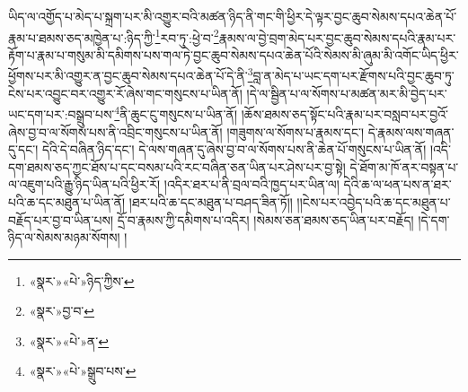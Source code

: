 ཡིད་ལ་འགྱོད་པ་མེད་པ་སྐྲག་པར་མི་འགྱུར་བའི་མཚན་ཉིད་ནི་གང་གི་ཕྱིར་དེ་ལྟར་བྱང་ཆུབ་སེམས་དཔའ་ཆེན་པོ་རྣམ་པ་ཐམས་ཅད་མཁྱེན་པ་:ཉིད་ཀྱི་\footnote{«སྣར་»«པེ་»ཉིད་ཀྱིས་}རབ་ཏུ་:ཕྱེ་བ་\footnote{«སྣར་»བྱ་བ་}རྣམས་ལ་བྱེ་བྲག་མེད་པར་བྱང་ཆུབ་སེམས་དཔའི་རྣམ་པར་རྟོག་པ་རྣམ་པ་གསུམ་མི་དམིགས་པས་གལ་ཏེ་བྱང་ཆུབ་སེམས་དཔའ་ཆེན་པོའི་སེམས་མི་ཞུམ་མི་འགོང་ཡིད་ཕྱིར་ཕྱོགས་པར་མི་འགྱུར་ན་བྱང་ཆུབ་སེམས་དཔའ་ཆེན་པོ་དེ་ནི་\footnote{«སྣར་»«པེ་»ན་}བླ་ན་མེད་པ་ཡང་དག་པར་རྫོགས་པའི་བྱང་ཆུབ་ཏུ་ངེས་པར་འབྱུང་བར་འགྱུར་རོ་ཞེས་གང་གསུངས་པ་ཡིན་ནོ། །དེ་ལ་སྦྱིན་པ་ལ་སོགས་པ་མཚན་མར་མི་བྱེད་པར་ཡང་དག་པར་:བསྒྲུབ་པས་\footnote{«སྣར་»«པེ་»སྒྲུབ་པས་}ནི་ཆུང་ངུ་གསུངས་པ་ཡིན་ནོ། །ཆོས་ཐམས་ཅད་སྟོང་པའི་རྣམ་པར་བསླབ་པར་བྱའོ་ཞེས་བྱ་བ་ལ་སོགས་པས་ནི་འབྲིང་གསུངས་པ་ཡིན་ནོ། །གཟུགས་ལ་སོགས་པ་རྣམས་དང་། དེ་རྣམས་ལས་གཞན་དུ་དང་། དེའི་དེ་བཞིན་ཉིད་དང་། དེ་ལས་གཞན་དུ་ཞེས་བྱ་བ་ལ་སོགས་པས་ནི་ཆེན་པོ་གསུངས་པ་ཡིན་ནོ། །འདི་དག་ཐམས་ཅད་ཀྱང་ཐོས་པ་དང་བསམ་པའི་རང་བཞིན་ཅན་ཡིན་པར་ཤེས་པར་བྱ་སྟེ། དེ་ཐོག་མ་ཁོ་ནར་བསྟན་པ་ལ་འཇུག་པའི་རྒྱུ་ཉིད་ཡིན་པའི་ཕྱིར་རོ། །འདིར་ཐར་པ་ནི་བྲལ་བའི་ཁྱད་པར་ཡིན་ལ། དེའི་ཆ་ལ་ཕན་པས་ན་ཐར་པའི་ཆ་དང་མཐུན་པ་ཡིན་ནོ། །ཐར་པའི་ཆ་དང་མཐུན་པ་བཤད་ཟིན་ཏོ།། །།ངེས་པར་འབྱེད་པའི་ཆ་དང་མཐུན་པ་བརྗོད་པར་བྱ་བ་ཡིན་པས། དྲོ་བ་རྣམས་ཀྱི་དམིགས་པ་འདིར། །སེམས་ཅན་ཐམས་ཅད་ཡིན་པར་བརྗོད། །དེ་དག་ཉིད་ལ་སེམས་མཉམ་སོགས། །
